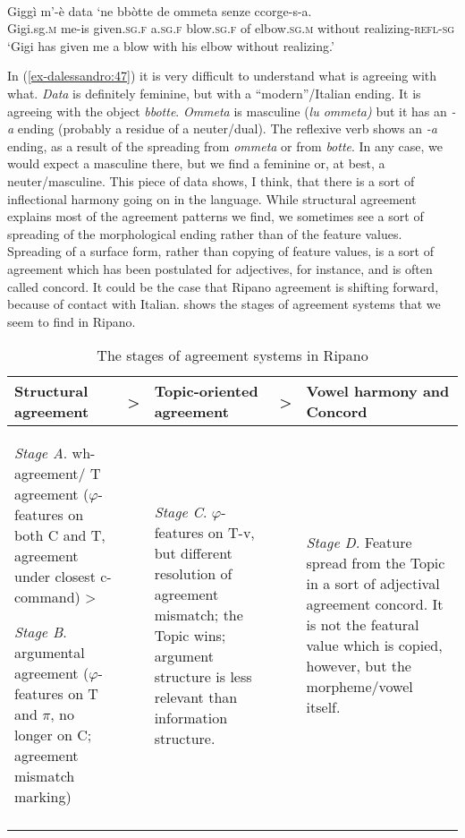 \documentclass[output=paper
,modfonts
,nonflat]{langsci/langscibook}
\begin{document}
\begin{exe}
	\ex \label{ex-dalessandro:47}\citet[113]{Rossi2008}\\
	\gll Giggì   m’-è   data     ‘ne   bbòtte     de   ommeta senze    ccorge-s-a.\\
	Gigi.sg.\textsc{m} me-is  given.\textsc{sg.f}  a.\textsc{sg.f} blow.\textsc{sg.f} of  elbow.\textsc{sg.m} without  realizing-\textsc{refl-sg}\\
	\glt `Gigi has given me a blow with his elbow without realizing.'
\end{exe}
In (\ref{ex-dalessandro:47}) it is very difficult to understand what is agreeing with what. \textit{Data} is definitely feminine, but with a “modern”/Italian ending. It is agreeing with the object \textit{bbotte}. \textit{Ommeta} is masculine (\textit{lu ommeta)} but it has an \textit{-a} ending (probably a residue of a neuter/dual). The reflexive verb shows an \textit{-a} ending, as a result of the spreading from \textit{ommeta} or from \textit{botte}. In any case, we would expect a masculine there, but we find a feminine or, at best, a neuter/masculine. This piece of data shows, I think, that there is a sort of inflectional harmony going on in the language. While structural agreement explains most of the agreement patterns we find, we sometimes see a sort of spreading of the morphological ending rather than of the feature values. 
Spreading of a surface form, rather than copying of feature values, is a sort of agreement which has been postulated for adjectives, for instance, and is often called concord. It could be the case that Ripano agreement is shifting forward, because of contact with Italian.
 shows the stages of agreement systems that we seem to find in Ripano.

\begin{table}
\caption{The stages of agreement systems in Ripano\label{tab-dalessandro:3}}
\begin{tabularx}{\textwidth}{X@{ }c@{ }X@{ }c@{ }X}
\lsptoprule
{Structural agreement}  & {>} & \multicolumn{1}{Q}{Topic-oriented agreement}  & {>}    & \multicolumn{1}{Q}{Vowel harmony and Concord}\\ 
\midrule
\textit{Stage A}. wh-agreement/ T agreement ($\varphi $-features on both C and T, agreement under closest c-command) >

\textit{Stage B}. argumental agreement ($\varphi $-features on T and $\pi $, no longer on C; agreement mismatch marking) &  & \textit{Stage C}. $\varphi $-features on T-v, but different resolution of agreement mismatch; the Topic wins; \newline argument structure is less relevant than information structure. &  & \textit{Stage D.} Feature spread from the Topic in a sort of adjectival agreement concord. It is not the featural value which is copied, however, but the morpheme/vowel itself.\\
\lspbottomrule
\end{tabularx}
\end{table}
\end{document}
